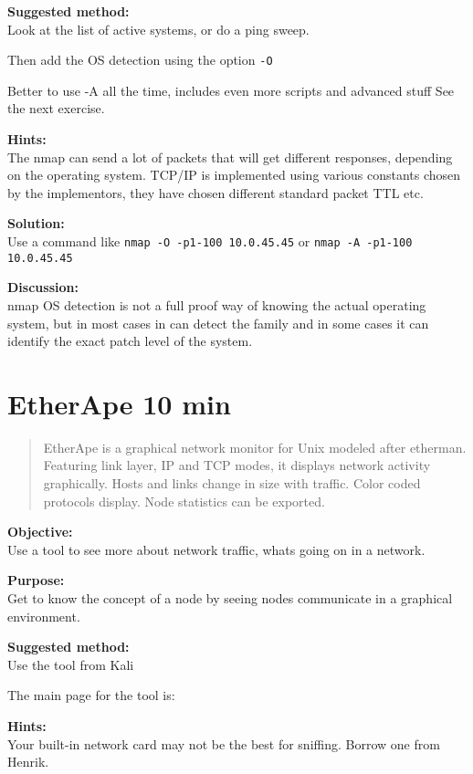 \documentclass[a4paper,11pt,notitlepage]{report}
\begin{document}
{\bf Suggested method:}\\
Look at the list of active systems, or do a ping sweep.

Then add the OS detection using the option \verb+-O+

Better to use -A all the time, includes even more scripts and advanced stuff
See the next exercise.

{\bf Hints:} \\
The nmap can send a lot of packets that will get different responses, depending on the operating system. TCP/IP is implemented using various constants chosen by the implementors, they have chosen different standard packet TTL etc.

{\bf Solution:}\\
Use a command like \verb+nmap -O -p1-100 10.0.45.45+ or  \verb+nmap -A -p1-100 10.0.45.45+


{\bf Discussion:}\\
nmap OS detection is not a full proof way of knowing the actual operating system, but in most cases in can detect the family and in some cases it can identify the exact patch level of the system.




\chapter{EtherApe 10 min}
\label{ex:etherape}


\begin{quote}
EtherApe is a graphical network monitor for Unix modeled after etherman. Featuring link layer, IP and TCP modes, it displays network activity graphically. Hosts and links change in size with traffic. Color coded protocols display.
Node statistics can be exported.
\end{quote}

{\bf Objective:}\\
Use a tool to see more about network traffic, whats going on in a network.

{\bf Purpose:}\\
Get to know the concept of a node by seeing nodes communicate in a graphical environment.

{\bf Suggested method:}\\
Use the tool from Kali

The main page for the tool is:

{\bf Hints:}\\
Your built-in network card may not be the best for sniffing. Borrow one from Henrik.
\end{document}
